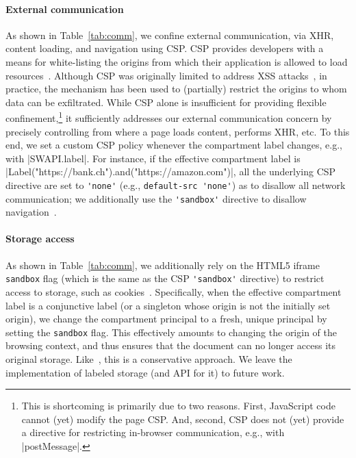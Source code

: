  
\paragraph{External communication}
%
As shown in Table~\ref{tab:comm}, we confine external communication,
via XHR, content loading, and navigation using CSP\@.
%
CSP provides developers with a
means for white-listing the origins from which their application is
allowed to load resources~\cite{csp}.
%
Although CSP was originally limited to address XSS
attacks~\cite{kerschbaum2007simple}, in practice, the mechanism has
been used to (partially) restrict the origins to whom data can be
exfiltrated.
%
While CSP alone is insufficient for providing flexible
confinement,\footnote{
This is shortcoming is primarily due to two reasons. First,
JavaScript code cannot (yet) modify the page CSP\@.
And, second, CSP does not (yet) provide a directive for restricting 
in-browser communication, e.g., with \js|postMessage|.
}
it sufficiently addresses our external communication concern by
precisely controlling from where a page loads content, performs XHR, etc.
%
To this end, we set a custom CSP policy whenever the compartment label
changes, e.g., with \js|SWAPI.label|.
%
For instance, if the effective compartment label is
\js|Label("https://bank.ch").and("https://amazon.com")|, all the
underlying CSP directive are set to \verb|'none'| (e.g.,
\verb|default-src 'none'|) as to disallow all network communication;
we additionally use the \verb|'sandbox'| directive to disallow
navigation~\cite{csp1.1,whatwg-html,html5}.
%

\paragraph{Storage access}
As shown in Table~\ref{tab:comm}, we additionally rely on the HTML5
iframe \verb|sandbox| flag (which is the same as the CSP
\verb|'sandbox'| directive) to restrict access to storage, such as cookies~\cite{html5}.
%
Specifically, when the effective compartment label is a conjunctive
label (or a singleton whose origin is not the initially set origin),
we change the compartment principal to a fresh, unique
principal by setting the \verb|sandbox| flag.
%
This effectively amounts to changing the origin of the browsing
context, and thus ensures that the document can no longer access its
original storage.
%
Like~\cite{Akhawe2013}, this is a conservative approach.
%
We leave the implementation of labeled storage (and API for it) to
future work.


